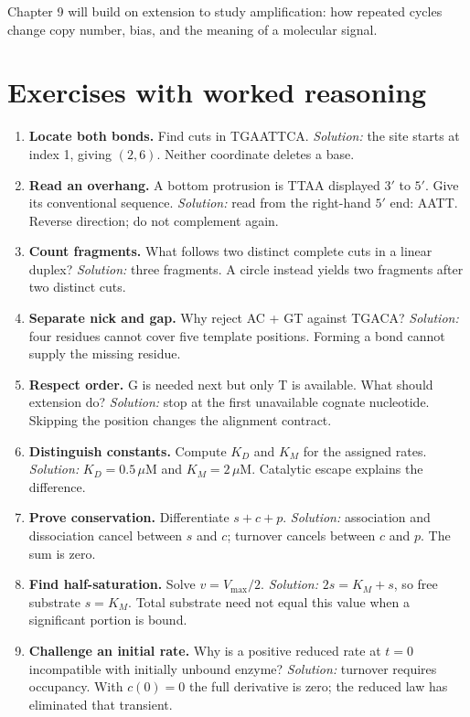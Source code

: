 Chapter 9 will build on extension to study amplification: how repeated cycles change copy number, bias, and the meaning of a molecular signal.

\section{Exercises with worked reasoning}

\begin{enumerate}
\item \textbf{Locate both bonds.} Find cuts in TGAATTCA.
\emph{Solution:} the site starts at index 1, giving $(2,6)$. Neither coordinate deletes a base.
\item \textbf{Read an overhang.} A bottom protrusion is TTAA displayed $3'$ to $5'$. Give its conventional sequence.
\emph{Solution:} read from the right-hand $5'$ end: AATT. Reverse direction; do not complement again.
\item \textbf{Count fragments.} What follows two distinct complete cuts in a linear duplex?
\emph{Solution:} three fragments. A circle instead yields two fragments after two distinct cuts.
\item \textbf{Separate nick and gap.} Why reject AC + GT against TGACA?
\emph{Solution:} four residues cannot cover five template positions. Forming a bond cannot supply the missing residue.
\item \textbf{Respect order.} G is needed next but only T is available. What should extension do?
\emph{Solution:} stop at the first unavailable cognate nucleotide. Skipping the position changes the alignment contract.
\item \textbf{Distinguish constants.} Compute $K_D$ and $K_M$ for the assigned rates.
\emph{Solution:} $K_D=0.5\,\mu$M and $K_M=2\,\mu$M. Catalytic escape explains the difference.
\item \textbf{Prove conservation.} Differentiate $s+c+p$.
\emph{Solution:} association and dissociation cancel between $s$ and $c$; turnover cancels between $c$ and $p$. The sum is zero.
\item \textbf{Find half-saturation.} Solve $v=V_{\max}/2$.
\emph{Solution:} $2s=K_M+s$, so free substrate $s=K_M$. Total substrate need not equal this value when a significant portion is bound.
\item \textbf{Challenge an initial rate.} Why is a positive reduced rate at $t=0$ incompatible with initially unbound enzyme?
\emph{Solution:} turnover requires occupancy. With $c(0)=0$ the full derivative is zero; the reduced law has eliminated that transient.

\end{enumerate}
